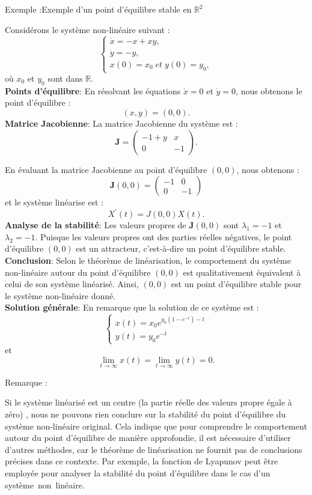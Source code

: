 \documentclass[12pt,a4paper]{report}%
\newcounter{remm}[chapter]
\newenvironment{remarque}[2][]
  {\refstepcounter{remm}
  \begin{bclogo}[
    couleur=white,
    arrondi=0.1,
    couleurBord=white,#1]{Remarque \theremm:#2}
  }
  {\end{bclogo}}
\newcounter{PP}[chapter]
\newenvironment{exemple}[2][]
  {\refstepcounter{PP}
  \begin{bclogo}[
    logo=\bccrayon , %
    couleur=white,
    arrondi=0.1,
    barre =snake,
     tailleOndu = 1.5,
    couleurBord=white,#1]{Exemple \thePP:#2}
  }
  {\end{bclogo}}
\begin{document}
\begin{exemple}{Exemple d'un point d'équilibre stable en \(\mathbb{R}^2\)}
Considérons le système non-linéaire suivant :
\[
\begin{cases}
\dot{x} = -x + xy, \\
\dot{y} = -y,\\
x(0)=x_0\; et \; y(0)=y_0,
\end{cases}
\]
où \( x_0 \) et \( y_0 \) sont dans \( \mathbb{R} \).\\
{\bf Points d'équilibre}: En résolvant les équations \(\dot{x} = 0\) et \(\dot{y} = 0\), nous obtenons le point d'équilibre :
\[
(x, y) = (0, 0).
\]
{\bf Matrice Jacobienne}: La matrice Jacobienne du système est :
\[
\mathbf{J} = \begin{pmatrix}
-1 + y & x \\
0 & -1
\end{pmatrix}.
\]

En évaluant la matrice Jacobienne au point d'équilibre \((0,0)\), nous obtenons :
\[
\mathbf{J}(0,0) = \begin{pmatrix}
-1 & 0 \\
0 & -1
\end{pmatrix}
\]
et le système linéarise est : 
$$
X^\prime(t)=J(0,0)X(t). 
$$
{\bf Analyse de la stabilité}: Les valeurs propres de \(\mathbf{J}(0,0)\) sont \(\lambda_1 = -1\) et \(\lambda_2 = -1\). Puisque les valeurs propres ont des parties réelles négatives, le point d'équilibre \((0,0)\) est un attracteur, c'est-à-dire un point d'équilibre stable.\\
{\bf Conclusion}: Selon le théorème de linéarisation, le comportement du système non-linéaire autour du point d'équilibre \((0,0)\) est qualitativement équivalent à celui de son système linéarisé. Ainsi, \((0,0)\) est un point d'équilibre stable pour le système non-linéaire donné.\\
{\bf  Solution générale}:  En remarque que la solution de ce système est : 
\[
\begin{cases}
	x(t) = x_0 e^{y_0(1-e^{-t})-t} \\
	y(t)= y_0 e^{-t}
\end{cases}
\]
et 
$$\lim\limits_{t\rightarrow \infty}	x(t)= \lim\limits_{t\rightarrow \infty}	y(t)=0.
$$
\end{exemple}
\begin{remarque}{}
Si le système linéarisé est un centre (la partie réelle des valeurs propre égale à zéro) , nous ne pouvons rien conclure sur la stabilité du point d'équilibre du système non-linéaire original. Cela indique que pour comprendre le comportement autour du point d’équilibre de manière approfondie, il est nécessaire d'utiliser d’autres méthodes, car le théorème de linéarisation ne fournit pas de conclusions précises dans ce contexte. Par exemple, la fonction de Lyapunov peut être employée pour analyser la stabilité du point d’équilibre dans le cas d’un système non linéaire.
\end{remarque}
\end{document}
